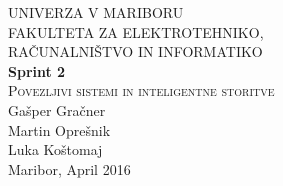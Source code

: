 \documentclass[a4paper,11pt]{article}
\begin{document}
\begin{titlepage}


\newcommand{\HRule}{\rule{\linewidth}{0.5mm}} %

\center %
 

\textsc{ UNIVERZA V MARIBORU\\ FAKULTETA ZA ELEKTROTEHNIKO,\\RAČUNALNIŠTVO IN INFORMATIKO}\\[5cm] %

{ \huge \bfseries \textbf{Sprint 2}}\\[0.4cm] %
\textsc{\large Povezljivi sistemi in inteligentne storitve}\\[5cm] %

{\large Gašper Gračner}\\[0.4cm]
{\large Martin Oprešnik}\\[0.4cm]
{\large Luka Koštomaj}\\[0.4cm] 

\vfill %
{\large Maribor, April 2016}\\[3cm] %
\end{titlepage}
\newpage

\end{document}
